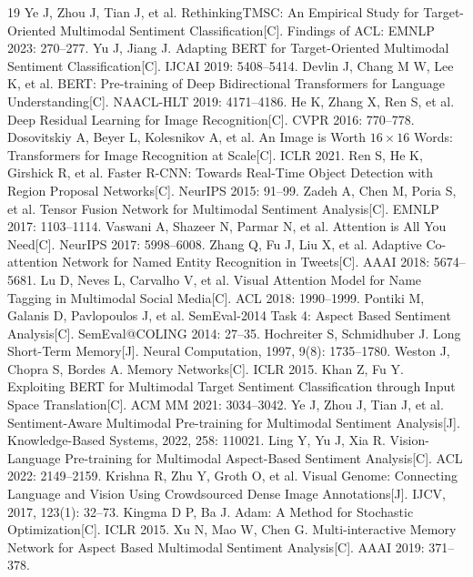 \documentclass[12pt]{ctexart}
\begin{document}
\clearpage
\begin{thebibliography}{19}
\small
{} Ye J, Zhou J, Tian J, et al. RethinkingTMSC: An Empirical Study for
Target-Oriented Multimodal Sentiment Classification[C]. Findings of ACL: EMNLP 2023: 270--277.
 Yu J, Jiang J. Adapting BERT for Target-Oriented Multimodal Sentiment
Classification[C]. IJCAI 2019: 5408--5414.
 Devlin J, Chang M W, Lee K, et al. BERT: Pre-training of Deep Bidirectional
Transformers for Language Understanding[C]. NAACL-HLT 2019: 4171--4186.
 He K, Zhang X, Ren S, et al. Deep Residual Learning for Image Recognition[C].
CVPR 2016: 770--778.
 Dosovitskiy A, Beyer L, Kolesnikov A, et al. An Image is Worth
$16\times16$ Words: Transformers for Image Recognition at Scale[C]. ICLR 2021.
 Ren S, He K, Girshick R, et al. Faster R-CNN: Towards Real-Time Object
Detection with Region Proposal Networks[C]. NeurIPS 2015: 91--99.
 Zadeh A, Chen M, Poria S, et al. Tensor Fusion Network for Multimodal
Sentiment Analysis[C]. EMNLP 2017: 1103--1114.
 Vaswani A, Shazeer N, Parmar N, et al. Attention is All You Need[C].
NeurIPS 2017: 5998--6008.
 Zhang Q, Fu J, Liu X, et al. Adaptive Co-attention Network for Named
Entity Recognition in Tweets[C]. AAAI 2018: 5674--5681.
 Lu D, Neves L, Carvalho V, et al. Visual Attention Model for Name Tagging in
Multimodal Social Media[C]. ACL 2018: 1990--1999.
 Pontiki M, Galanis D, Pavlopoulos J, et al. SemEval-2014 Task 4: Aspect
Based Sentiment Analysis[C]. SemEval@COLING 2014: 27--35.
 Hochreiter S, Schmidhuber J. Long Short-Term Memory[J]. Neural
Computation, 1997, 9(8): 1735--1780.
 Weston J, Chopra S, Bordes A. Memory Networks[C]. ICLR 2015.
 Khan Z, Fu Y. Exploiting BERT for Multimodal Target Sentiment Classification
through Input Space Translation[C]. ACM MM 2021: 3034--3042.
 Ye J, Zhou J, Tian J, et al. Sentiment-Aware Multimodal Pre-training for
Multimodal Sentiment Analysis[J]. Knowledge-Based Systems, 2022, 258: 110021.
 Ling Y, Yu J, Xia R. Vision-Language Pre-training for Multimodal Aspect-Based
Sentiment Analysis[C]. ACL 2022: 2149--2159.
 Krishna R, Zhu Y, Groth O, et al. Visual Genome: Connecting Language and
Vision Using Crowdsourced Dense Image Annotations[J]. IJCV, 2017, 123(1): 32--73.
 Kingma D P, Ba J. Adam: A Method for Stochastic Optimization[C]. ICLR 2015.
 Xu N, Mao W, Chen G. Multi-interactive Memory Network for Aspect Based
Multimodal Sentiment Analysis[C]. AAAI 2019: 371--378.
\end{thebibliography}
\end{document}
